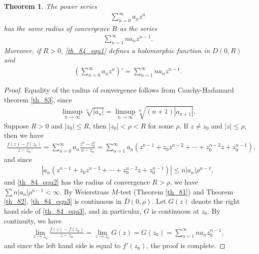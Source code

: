 \documentclass[11pt]{book}
\newtheorem{theorem}{Theorem}[chapter]
\theoremstyle{definition}
\numberwithin{equation}{chapter}
\begin{document}
\begin{theorem}
The power series
\begin{align}\label{th_84_equ1}
    \sum^\infty_{n=0} a_n z^n
\end{align}
has the same radius of convergence $R$ as the series
\begin{align}\label{th_84_equ2}
    \sum^\infty_{n=1} n a_n z^{n-1}.
\end{align}
Moreover, if $R > 0$, \eqref{th_84_equ1} defines a holomorphic function in $D(0,R)$ and 
\begin{align*}
    \left(\sum^\infty_{n=0} a_n z^n\right)' = \sum^\infty_{n=1} n a_n z^{n-1}.
\end{align*}
\end{theorem}
\begin{proof}
Equality of the radius of convergence follows from Cauchy-Hadamard theorem \ref{th_83}, since
\begin{align*}
    \limsup_{n\to\infty} \sqrt[n]{\left|a_n\right|} = \limsup_{n\to\infty} \sqrt[n]{(n + 1)\left|a_{n+1}\right|}.
\end{align*}
Suppose $R > 0$ and $\left|z_0\right| \leq R$, then $\left|z_0\right| < \rho < R$ for some $\rho$. If $z \neq z_0$ and $\left|z\right| \leq \rho$, then we have
\begin{align}\label{th_84_equ3}
    \frac{f(z) - f(z_0)}{z - z_0} = \sum^\infty_{n=0} a_n \frac{z^n - z_0^n}{a - z_0} = \sum^\infty_{n=1} a_n \left(z^{n-1} + z_0 z^{n-2} + \cdots + z_0^{n-2} z + z_0^{n-1}\right),
\end{align}
and since
\begin{align*}
    \left|a_n \left(z^{n-1} + z_0 z^{n-2} + \cdots + z_0^{n-2} z + z_0^{n-1}\right)\right| \leq n \left|a_n\right| \rho^{n-1},
\end{align*}
and \eqref{th_84_equ2} has the radius of convergence $R > \rho$, we have $\sum n \left|a_n\right| \rho^{n-1} < \infty$. By Weierstrass $M$-test (Theorem \ref{th_81}) and Theorem \ref{th_82}, \eqref{th_84_equ3} is continuous in $\overline{D}(0,\rho)$. Let $G(z)$ denote the right hand side of \eqref{th_84_equ3}, and in particular, $G$ is continuous at $z_0$. By continuity, we have
\begin{align*}
    \lim_{z \to z_0} \frac{f(z) - f(z_0)}{z - z_0} = \lim_{z \to z_0} G(z) = G(z_0) = \sum^\infty_{n=1} n a_n z_0^{n-1},
\end{align*}
and since the left hand side is equal to $f'(z_0)$, the proof is complete.
\end{proof}
\end{document}
